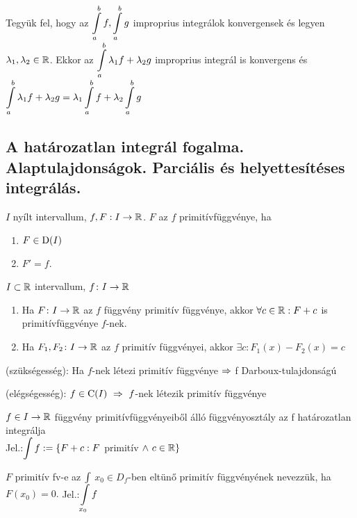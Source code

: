 \begin{te}
  Tegyük fel, hogy az $\di\Int_a^bf,\Int_a^bg$ improprius integrálok
  konvergensek és legyen $\lambda_1,\lambda_2\in\mathbb{R}$. Ekkor az $\di\Int_a^b
  {\lambda_1f+\lambda_2g}$ improprius integrál is konvergens és $\di\Int_a^b
  {\lambda_1f+\lambda_2g}=\lambda_1\Int_a^bf+\lambda_2\Int_a^bg$
\end{te}


\subsection{A határozatlan integrál fogalma. Alaptulajdonságok. Parciális és helyettesítéses integrálás.}
\begin{de}
  $I$ nyílt intervallum, $f,F:I\to\mathbb{R}$. $F$ az $f$ primitívfüggvénye, ha
\begin{enumerate}
\item $F\in\operatorname{D}(I)$
\item $F'=f$.
\end{enumerate}
\end{de}
\begin{te}$I\subset\mathbb{R}$ intervallum, $f\colon I\to\mathbb{R}$
  \begin{enumerate}
  \item  Ha $F\colon I\to\mathbb{R}$ az $f$ függvény primitív függvénye, akkor $\forall c\in\mathbb{R}:F+c$ is primitívfüggvénye $f$-nek.
  \item Ha $F_1,F_2\colon I\to\mathbb{R}$ az $f$ primitív függvényei, akkor $\exists c\colon F_1(x)-F_2(x)=c$
  \end{enumerate}
\end{te}

\begin{te}
\begin{enumbz}
\item (szükségesség): Ha $f$-nek létezi primitív függvénye $\Rightarrow$ f Darboux-tulajdonságú
\item (elégségesség): $f\in\Folyt(I)\ \nn\ f$-nek létezik primitív függvénye
\end{enumbz}
\end{te}

\begin{de}
  $f\in I\to\mathbb{R}$ függvény primitívfüggvényeiből álló függvényosztály az f határozatlan
  integrálja\\
  Jel.:$\di\Int{f}:=\{F+c:F$ primitív $\land\ c\in\mathbb{R}\}$
\end{de}

\begin{de}
  $F$ primitív fv-e az $\Int$ $x_0\in D_f$-ben eltünő primitív függvényének
  nevezzük, ha $F(x_0)=0.$ Jel.:$\di\Int_{x_0}f$
\end{de}

